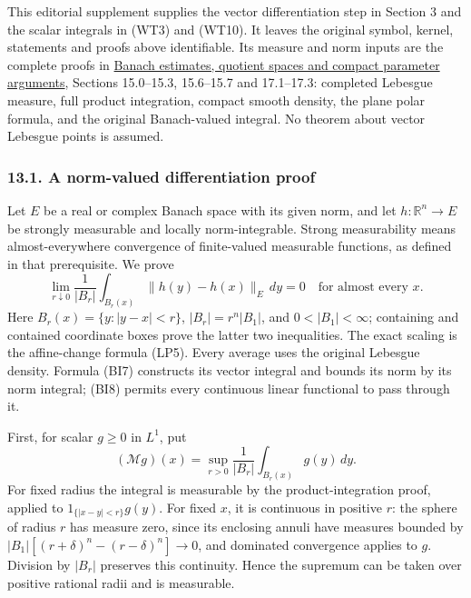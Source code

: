 \documentclass[
  11pt,
]{article}
\begin{document}
This editorial supplement supplies the vector differentiation step in
Section 3 and the scalar integrals in (WT3) and (WT10). It leaves the
original symbol, kernel, statements and proofs above identifiable. Its
measure and norm inputs are the complete proofs in
\href{banach-foundation-bridges.pdf}{Banach estimates, quotient spaces
and compact parameter arguments}, Sections 15.0--15.3, 15.6--15.7 and
17.1--17.3: completed Lebesgue measure, full product integration,
compact smooth density, the plane polar formula, and the original
Banach-valued integral. No theorem about vector Lebesgue points is
assumed.

\subsubsection{13.1. A norm-valued differentiation
proof}\label{a-norm-valued-differentiation-proof}

Let \(E\) be a real or complex Banach space with its given norm, and let
\(h:\mathbb R^n\to E\) be strongly measurable and locally
norm-integrable. Strong measurability means almost-everywhere
convergence of finite-valued measurable functions, as defined in that
prerequisite. We prove \[
 \lim_{r\downarrow0}\frac1{|B_r|}
    \int_{B_r(x)}\|h(y)-h(x)\|_E\,dy=0
             \quad\text{for almost every }x.                 \tag{TD1}
\] Here \(B_r(x)=\{y:|y-x|<r\}\), \(|B_r|=r^n|B_1|\), and
\(0<|B_1|<\infty\); containing and contained coordinate boxes prove the
latter two inequalities. The exact scaling is the affine-change formula
(LP5). Every average uses the original Lebesgue density. Formula (BI7)
constructs its vector integral and bounds its norm by its norm integral;
(BI8) permits every continuous linear functional to pass through it.

First, for scalar \(g\geq0\) in \(L^1\), put \[
 (\mathcal Mg)(x)=\sup_{r>0}\frac1{|B_r|}
                   \int_{B_r(x)}g(y)\,dy.
\] For fixed radius the integral is measurable by the
product-integration proof, applied to \(1_{\{|x-y|<r\}}g(y)\). For fixed
\(x\), it is continuous in positive \(r\): the sphere of radius \(r\)
has measure zero, since its enclosing annuli have measures bounded by
\(|B_1|[(r+\delta)^n-(r-\delta)^n]\to0\), and dominated convergence
applies to \(g\). Division by \(|B_r|\) preserves this continuity. Hence
the supremum can be taken over positive rational radii and is
measurable.
\end{document}
